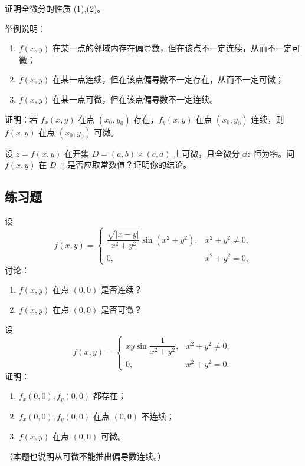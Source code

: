 \begin{xthought}[2]
证明全微分的性质 (1),(2)。
\end{xthought}

\begin{xthought}[3]
举例说明：
  \begin{enumerate}[label=(\arabic*)]
    \item $f(x,y)$ 在某一点的邻域内存在偏导数，但在该点不一定连续，从而不一定可微；
    \item $f(x,y)$ 在某一点连续，但在该点偏导数不一定存在，从而不一定可微；
    \item $f(x,y)$ 在某一点可微，但在该点偏导数不一定连续。
  \end{enumerate}
\end{xthought}

\begin{xthought}[4]
证明：若 $f_x(x,y)$ 在点 $(x_0,y_0)$ 存在，$f_y(x,y)$ 在点 $(x_0,y_0)$ 连续，则 $f(x,y)$ 在点 $(x_0,y_0)$ 可微。
\end{xthought}

\begin{xthought}[5]
设 $z=f(x,y)$ 在开集 $D=(a,b)\times(c,d)$ 上可微，且全微分 $\dd z$ 恒为零。问 $f(x,y)$ 在 $D$ 上是否应取常数值？证明你的结论。
\end{xthought}

\subsection{练习题}

\begin{xexercise}[1]
设
  \[
    f(x,y)=
    \begin{cases}
      \dfrac{\sqrt{|x-y|}}{x^2+y^2}\sin(x^2+y^2), & x^2+y^2\ne0,\\
      0, & x^2+y^2=0,
    \end{cases}
  \]
  讨论：
  \begin{enumerate}[label=(\arabic*)]
    \item $f(x,y)$ 在点 $(0,0)$ 是否连续？
    \item $f(x,y)$ 在点 $(0,0)$ 是否可微？
  \end{enumerate}
\end{xexercise}

\begin{xexercise}[2]
设
  \[
    f(x,y)=
    \begin{cases}
      xy\sin\dfrac1{x^2+y^2}, & x^2+y^2\ne0,\\
      0, & x^2+y^2=0.
    \end{cases}
  \]
  证明：
  \begin{enumerate}[label=(\arabic*)]
    \item $f_x(0,0),f_y(0,0)$ 都存在；
    \item $f_x(0,0),f_y(0,0)$ 在点 $(0,0)$ 不连续；
    \item $f(x,y)$ 在点 $(0,0)$ 可微。
  \end{enumerate}
  （本题也说明从可微不能推出偏导数连续。）
\end{xexercise}

